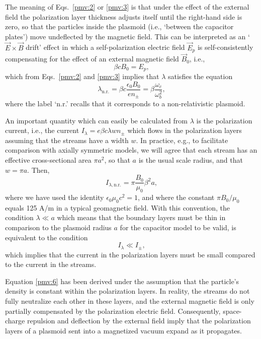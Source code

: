 \documentclass [12pt,a4paper,     ]{report} %
\begin{document}
    The meaning of Eqs.~\eqref{pmv:2} or \eqref{pmv:3} is that under the effect of the external field the polarization layer thickness adjusts itself until the right-hand side is zero, so that the particles inside the plasmoid (i.e., `between the capacitor plates') move undeflected by the magnetic field.  This can be interpreted as an `$\vec E \times \vec B$ drift' effect in which a self-polarization electric field $\vec E_p$ is self-consistently compensating for the effect of an external magnetic field $\vec B_0$, i.e.,
%
\begin{equation}\label{pmv:4} 
        \beta c B_0 = E_p,
\end{equation}
%
which from Eqs.~\eqref{pmv:2} and \eqref{pmv:3} implies that $\lambda$ satisfies the equation
%
\begin{equation}\label{pmv:5} 
        \lambda_{\text{n.r.}} = \beta c \frac{\epsilon_0 B_0}{e n_\pm}
                              = \beta \frac{\omega_c}{\omega_b^2}, 
\end{equation}
%
where the label `n.r.' recalls that it corresponds to a non-relativistic plasmoid.


   An important quantity which can easily be calculated from $\lambda$ is the polarization current, i.e., the current $I_\lambda = e \beta c \lambda w n_\pm$ which flows in the polarization layers assuming that the streams have a width $w$.  In practice, e.g., to facilitate comparison with axially symmetric models, we will agree that each stream has an effective cross-sectional area $\pi a^2$, so that $a$ is the usual scale radius, and that $w=\pi a$.  Then, 
%
\begin{equation}\label{pmv:6} 
         I_{\lambda,\text{n.r.}} = \pi \frac{B_0}{\mu_0} \beta^2 a,
\end{equation}
%
where we have used the identity $\epsilon_0\mu_0c^2=1$, and where the constant $\pi {B_0}/{\mu_0}$ equals 125 A/m in a typical geomagnetic field.  With this convention, the condition $\lambda \ll a$ which means that the boundary layers must be thin in comparison to the plasmoid radius $a$ for the capacitor model to be valid, is equivalent to the condition
%
\begin{equation}\label{pmv:7} 
         I_\lambda \ll I_\pm,
\end{equation}
%
which implies that the current in the polarization layers must be small compared to the current in the streams.

   Equation \eqref{pmv:6} has been derived under the assumption that the particle's density is constant within the polarization layers.  In reality, the streams do not fully neutralize each other in these layers, and the external magnetic field is only partially compensated by the polarization electric field. Consequently, space-charge repulsion and deflection by the external field imply that the polarization layers of a plasmoid sent into a magnetized vacuum expand as it propagates.
\end{document}
